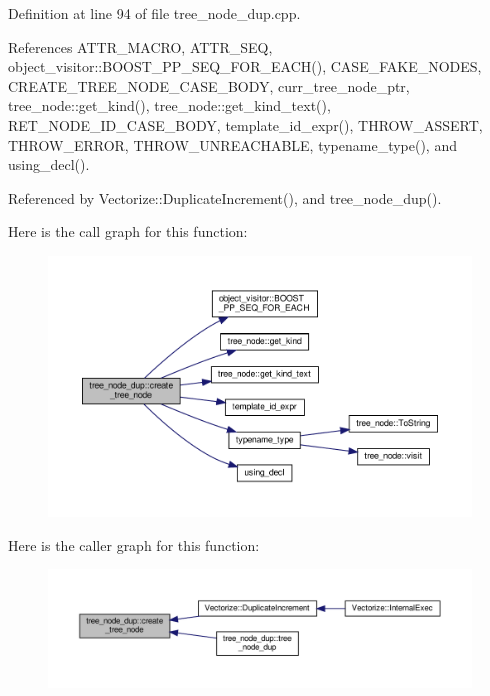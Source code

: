 Definition at line 94 of file tree\+\_\+node\+\_\+dup.\+cpp.



References A\+T\+T\+R\+\_\+\+M\+A\+C\+RO, A\+T\+T\+R\+\_\+\+S\+EQ, object\+\_\+visitor\+::\+B\+O\+O\+S\+T\+\_\+\+P\+P\+\_\+\+S\+E\+Q\+\_\+\+F\+O\+R\+\_\+\+E\+A\+C\+H(), C\+A\+S\+E\+\_\+\+F\+A\+K\+E\+\_\+\+N\+O\+D\+ES, C\+R\+E\+A\+T\+E\+\_\+\+T\+R\+E\+E\+\_\+\+N\+O\+D\+E\+\_\+\+C\+A\+S\+E\+\_\+\+B\+O\+DY, curr\+\_\+tree\+\_\+node\+\_\+ptr, tree\+\_\+node\+::get\+\_\+kind(), tree\+\_\+node\+::get\+\_\+kind\+\_\+text(), R\+E\+T\+\_\+\+N\+O\+D\+E\+\_\+\+I\+D\+\_\+\+C\+A\+S\+E\+\_\+\+B\+O\+DY, template\+\_\+id\+\_\+expr(), T\+H\+R\+O\+W\+\_\+\+A\+S\+S\+E\+RT, T\+H\+R\+O\+W\+\_\+\+E\+R\+R\+OR, T\+H\+R\+O\+W\+\_\+\+U\+N\+R\+E\+A\+C\+H\+A\+B\+LE, typename\+\_\+type(), and using\+\_\+decl().



Referenced by Vectorize\+::\+Duplicate\+Increment(), and tree\+\_\+node\+\_\+dup().

Here is the call graph for this function\+:
\nopagebreak
\begin{figure}[H]
\begin{center}
\leavevmode
\includegraphics[width=350pt]{d8/dd5/structtree__node__dup_abec376e3d87e9de8ef2c9d271b185a0a_cgraph}
\end{center}
\end{figure}
Here is the caller graph for this function\+:
\nopagebreak
\begin{figure}[H]
\begin{center}
\leavevmode
\includegraphics[width=350pt]{d8/dd5/structtree__node__dup_abec376e3d87e9de8ef2c9d271b185a0a_icgraph}
\end{center}
\end{figure}


